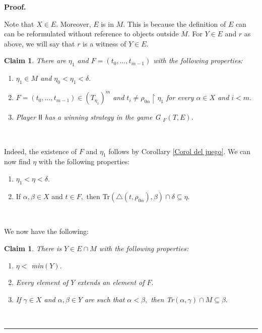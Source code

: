 \documentclass{article}
\newtheorem{claim}[theorem]{Claim}
\newenvironment{proof}[1][Proof]{\noindent\textbf{#1.} }{\ \rule{0.5em}{0.5em}}
\begin{document}
\begin{proof}
\qquad\ \qquad\ \qquad\ \ \ 

Note that $X\in E.$ Moreover, $E$ is in $M.$ This is because the definition of
$E$ can can be reformulated without reference to objects outside $M.$ For
$Y\in E$ and $r$ as above, we will say that $r$ is a witness of $Y\in E.$

\begin{claim}
There are $\eta_{1}$ and $F=\left(  t_{0},...,t_{m-1}\right)  $ with the
following properties:

\begin{enumerate}
\item $\eta_{1}\in M$ and $\eta_{0}<\eta_{1}<\delta.$

\item $F=\left(  t_{0},...,t_{m-1}\right)  \in\left(  T_{\eta_{1}}\right)
^{m}$ and $t_{i}\neq\rho_{0\alpha}\upharpoonright\eta_{1}$ for every
$\alpha\in X$ and $i<m.$

\item Player $\mathsf{II}$ has a winning strategy in the game \emph{G}%
$_{F}\left(  T,E\right)  .$
\end{enumerate}
\end{claim}

\qquad\ \ \ \qquad\ 

Indeed, the existence of $F$ and $\eta_{1}$ follows by Corollary
\ref{Corol del juego}. We can now find $\eta$ with the following properties:

\begin{enumerate}
\item $\eta_{1}<\eta<\delta.$

\item If $\alpha,\beta\in X$ and $t\in F,$ then \textsf{Tr}$(\triangle
(t,\rho_{0\alpha}),\beta)\cap\delta\subseteq\eta.$
\end{enumerate}

\qquad\ \qquad\ \ 

We now have the following:

\begin{claim}
There is $Y\in E\cap M$ with the following properties:
\label{Claim PFA C suc cosa Y}

\begin{enumerate}
\item $\eta<$ \textsf{min}$\left(  Y\right)  .$

\item Every element of $Y$ extends an element of $F.$

\item If $\gamma\in X$ and $\alpha,\beta\in Y$ are such that $\alpha<\beta,$
then \textsf{Tr}$(\alpha,\gamma)\cap M\subseteq\beta.$
\end{enumerate}
\end{claim}


\end{proof}
\end{document}

